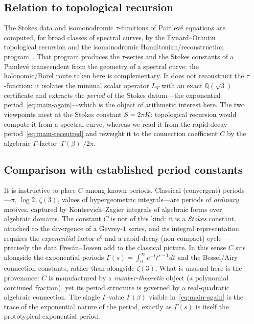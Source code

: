 \documentclass[11pt,reqno]{amsart}
\theoremstyle{plain}
\theoremstyle{definition}
\newcommand{\LV}{L_{V}}
\newcommand{\Qsqrt}{\mathbb{Q}(\sqrt3)}
\providecommand{\C}{}\renewcommand{\C}{C}
\begin{document}
\subsection{Relation to topological recursion}
The Stokes data and isomonodromic $\tau$-functions of Painlev\'e equations are computed, for broad
classes of spectral curves, by the Eynard--Orantin topological recursion and the isomonodromic
Hamiltonian/reconstruction program~\cite{MarchalOrantin,IwakiMarchalSaenz,MarchalAlameddine}. That
program produces the $\tau$-series and the Stokes constants of a Painlev\'e transcendent from the
geometry of a spectral curve; the holonomic/Borel route taken here is complementary. It does not
reconstruct the $\tau$-function: it isolates the minimal scalar operator $\LV$ with an exact
$\Qsqrt$ certificate and extracts the \emph{period} of the Stokes datum---the exponential
period~\eqref{eq:main-again}---which is the object of arithmetic interest here. The two viewpoints
meet at the Stokes constant $S=2\pi K$: topological recursion would compute it from a spectral
curve, whereas we read it from the rapid-decay period~\eqref{eq:main-recentred} and reweight it to
the connection coefficient $\C$ by the algebraic $\Gamma$-factor $\lvert\Gamma(\beta)\rvert/2\pi$.

\subsection{Comparison with established period constants}
It is instructive to place $\C$ among known periods. Classical (convergent) periods---$\pi$,
$\log2$, $\zeta(3)$, values of hypergeometric integrals---are periods of \emph{ordinary} motives,
captured by Kontsevich--Zagier integrals of algebraic forms over algebraic domains. The constant
$\C$ is not of this kind: it is a \emph{Stokes} constant, attached to the divergence of a
Gevrey-$1$ series, and its integral representation requires the \emph{exponential} factor $e^{\xi}$
and a rapid-decay (non-compact) cycle---precisely the data Fres\'an--Jossen add to the classical
picture. In this sense $\C$ sits alongside the exponential periods $\Gamma(s)=\int_0^\infty
e^{-t}t^{s-1}dt$ and the Bessel/Airy connection constants, rather than alongside $\zeta(3)$. What
is unusual here is the provenance: $\C$ is manufactured by a \emph{number-theoretic} object (a
polynomial continued fraction), yet its period structure is governed by a real-quadratic
algebraic connection. The single $\Gamma$-value $\Gamma(\beta)$ visible
in~\eqref{eq:main-again} is the trace of the exponential nature of the period, exactly as
$\Gamma(s)$ is itself the prototypical exponential period.
\end{document}

